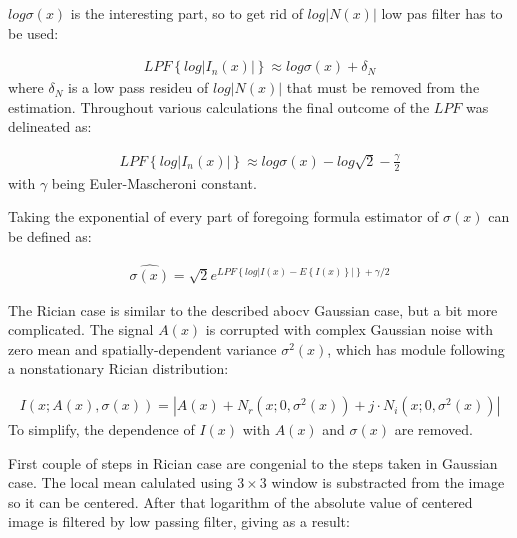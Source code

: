 $log\sigma(x)$ is the interesting part, so to get rid of $log\left | N(x) \right |$ low pas filter has to be used:

\begin{equation}
\begin{aligned}LPF\left \{ log\left |  I_{n}(x)\right | \right \}\approx log\sigma(x)+\delta _{N}\end{aligned}
\end{equation}
where $\delta_{N}$ is a low pass resideu of $log\left | N(x) \right |$ that must be removed from the estimation.
Throughout various calculations the final outcome of the $LPF$ was delineated as:

\begin{equation}
\begin{aligned}LPF\left \{ log\left |  I_{n}(x)\right | \right \}\approx log\sigma(x)-log\sqrt{2}-\frac{\gamma }{2}\end{aligned}
\end{equation}
with $\gamma$ being Euler-Mascheroni constant.

Taking the exponential of every part of foregoing formula estimator of $\sigma(x)$ can be defined as:

\begin{equation}
\begin{aligned}\widehat{\sigma(x)}=\sqrt{2}e^{LPF\left \{ log\left | I(x)-E\left \{ I(x) \right \} \right | \right \}+\gamma/2}\end{aligned}
\end{equation}


The Rician case is similar to the described abocv Gaussian case, but a bit more complicated. The signal $A(x)$ is corrupted with complex Gaussian noise with zero mean and spatially-dependent variance $\sigma^{2}(x)$, which has module following a nonstationary Rician distribution:


\begin{equation}
\begin{aligned}I(x;A(x),\sigma(x))=\left | A(x)+N_{r}(x;0,\sigma^{2}(x))+j\cdot N_{i}(x;0,\sigma^{2}(x)) \right |\end{aligned}
\end{equation}
To simplify, the dependence of $I(x)$ with $A(x)$ and $\sigma(x)$ are removed.

First couple of steps in Rician case are congenial to the steps taken in Gaussian case. The local mean calulated using $3\times 3$ window is substracted from the image so it can be centered. After that logarithm of the absolute value of centered image is filtered by low passing filter, giving as a result:

